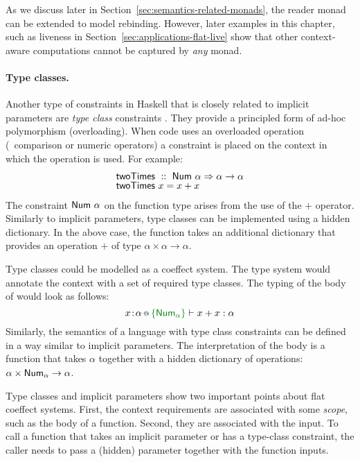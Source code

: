 As we discuss later in Section~\ref{sec:semantics-related-monads}, the reader monad can be extended
to model rebinding. However, later examples in this chapter, such as liveness in
Section~\ref{sec:applications-flat-live} show that other context-aware computations
cannot be captured by \emph{any} monad.


\paragraph{Type classes.}
Another type of constraints in Haskell that is closely related to implicit parameters are
\emph{type class} constraints \cite{app-type-classes}. They provide a principled form of ad-hoc
polymorphism (overloading). When code uses an overloaded operation (\eg~comparison or numeric
operators) a constraint is placed on the context in which the operation is used. For example:
%
\begin{equation*}
\begin{array}{l}
 \textnormal{\sffamily twoTimes}~::~\textnormal{\sffamily Num}~\alpha \Rightarrow \alpha \rightarrow \alpha \\[-0.25em]
 \textnormal{\sffamily twoTimes}~x=x+x
\end{array}
\end{equation*}
%
The constraint $\textnormal{\sffamily Num}~\alpha$ on the function type arises from the use of the $+$ operator.
Similarly to implicit parameters, type classes can be implemented using a hidden dictionary. In
the above case, the function  takes an additional dictionary that provides an operation
$+$ of type $\alpha \times \alpha \rightarrow \alpha$.

Type classes could be modelled as a coeffect system. The type system would annotate the context
with a set of required type classes. The typing of the body of  would look as
follows:
%
\begin{equation*}
\coctx{x\!:\!\alpha}{ \cclrd{\{ \ident{Num}_\alpha \}} } \vdash x + x : \alpha
\end{equation*}
%
Similarly, the semantics of a language with type class constraints can be defined in a way
similar to implicit parameters. The interpretation of the body is a function that takes $\alpha$
together with a hidden dictionary of operations: $\alpha \times \textnormal{\sffamily Num}_\alpha \rightarrow \alpha$.

Type classes and implicit parameters show two important points about flat coeffect systems.
First, the context requirements are associated with some \emph{scope}, such as the body
of a function. Second, they are associated with the input. To call a function that takes an
implicit parameter or has a type-class constraint, the caller needs to pass a (hidden) parameter
together with the function inputs.

